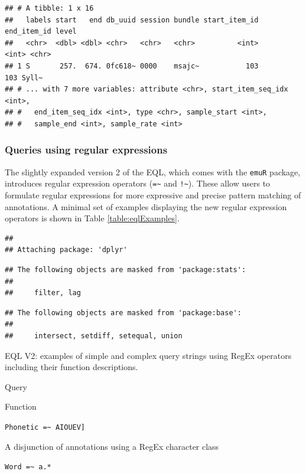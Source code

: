 \documentclass[]{book}
\begin{document}
\begin{verbatim}
## # A tibble: 1 x 16
##   labels start   end db_uuid session bundle start_item_id end_item_id level
##   <chr>  <dbl> <dbl> <chr>   <chr>   <chr>          <int>       <int> <chr>
## 1 S       257.  674. 0fc618~ 0000    msajc~           103         103 Syll~
## # ... with 7 more variables: attribute <chr>, start_item_seq_idx <int>,
## #   end_item_seq_idx <int>, type <chr>, sample_start <int>,
## #   sample_end <int>, sample_rate <int>
\end{verbatim}

\hypertarget{queries-using-regular-expressions}{%
\subsubsection{Queries using regular expressions}\label{queries-using-regular-expressions}}

The slightly expanded version 2 of the EQL, which comes with the \texttt{emuR} package, introduces regular expression operators (\texttt{=\textasciitilde{}} and \texttt{!\textasciitilde{}}). These allow users to formulate regular expressions for more expressive and precise pattern matching of annotations. A minimal set of examples displaying the new regular expression operators is shown in Table \ref{table:eqlExamples}.

\begin{verbatim}
## 
## Attaching package: 'dplyr'
\end{verbatim}

\begin{verbatim}
## The following objects are masked from 'package:stats':
## 
##     filter, lag
\end{verbatim}

\begin{verbatim}
## The following objects are masked from 'package:base':
## 
##     intersect, setdiff, setequal, union
\end{verbatim}

\label{tab:eqlExamples}EQL V2: examples of simple and complex query strings using RegEx operators including their function descriptions.

Query

Function

\texttt{Phonetic\ =\textasciitilde{}\ \textquotesingle{}{[}AIOUEV{]}\textquotesingle{}}

A disjunction of annotations using a RegEx character class

\texttt{Word\ =\textasciitilde{}\ a.*}
\end{document}
